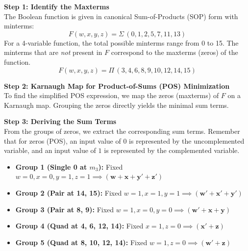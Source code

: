\documentclass[12pt,a3paper]{article}
\begin{document}
\begin{enumerate}
\begin{tcolorbox}[enhanced,breakable,ansbox,colback=cC!4,colframe=cC,boxrule=0.8pt,arc=5pt,title={\textbf{Answer}},fonttitle=\bfseries\color{white},colbacktitle=cC]
\textbf{Step 1: Identify the Maxterms} \\
The Boolean function is given in canonical Sum-of-Products (SOP) form with minterms:
\[ F(w,x,y,z) = \Sigma\,(0,1,2,5,7,11,13) \]
For a 4-variable function, the total possible minterms range from 0 to 15. The minterms that are \textit{not} present in $F$ correspond to the maxterms (zeros) of the function.
\[ F(w,x,y,z) = \Pi\,(3,4,6,8,9,10,12,14,15) \]

\vspace{0.3cm}
\textbf{Step 2: Karnaugh Map for Product-of-Sums (POS) Minimization} \\
To find the simplified POS expression, we map the zeros (maxterms) of $F$ on a Karnaugh map. Grouping the zeros directly yields the minimal sum terms. 

\begin{center}
\begin{karnaugh-map}[4][4][1][$yz$][$wx$]
    
\end{karnaugh-map}
\end{center}

\textbf{Step 3: Deriving the Sum Terms} \\
From the groups of zeros, we extract the corresponding sum terms. Remember that for zeros (POS), an input value of $0$ is represented by the uncomplemented variable, and an input value of $1$ is represented by the complemented variable.

\begin{itemize}
    \item \textbf{Group 1 (Single 0 at $m_3$):} Fixed $w=0, x=0, y=1, z=1 \implies \mathbf{(w + x + y' + z')}$
    \item \textbf{Group 2 (Pair at 14, 15):} Fixed $w=1, x=1, y=1 \implies \mathbf{(w' + x' + y')}$
    \item \textbf{Group 3 (Pair at 8, 9):} Fixed $w=1, x=0, y=0 \implies \mathbf{(w' + x + y)}$
    \item \textbf{Group 4 (Quad at 4, 6, 12, 14):} Fixed $x=1, z=0 \implies \mathbf{(x' + z)}$
    \item \textbf{Group 5 (Quad at 8, 10, 12, 14):} Fixed $w=1, z=0 \implies \mathbf{(w' + z)}$
\end{itemize}


\end{tcolorbox}
\end{enumerate}
\end{document}
